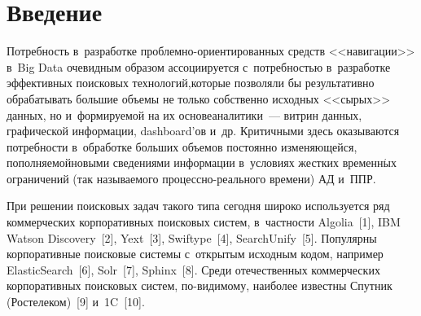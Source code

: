 

\vspace*{-2pt}



\thispagestyle{headings}

\begin{multicols}{2}

\label{st\stat}
   

  \section{Введение}
   
  Потребность в~разработке проблемно-ори\-ен\-ти\-ро\-ван\-ных средств 
<<навигации>> в~Big Data очевидным образом ассоциируется с~по\-треб\-ностью 
в~разработке эффективных поисковых технологий,\linebreak которые позволяли бы 
результативно обрабатывать большие объемы не только собственно исходных 
<<сырых>> данных, но и~формируемой на их основе\linebreak аналитики~--- витрин 
данных, графической информации, dashboard'ов и~др. Критичными здесь 
оказываются потребности в~обработке больших объемов постоянно 
изменяющейся, пополняемой\linebreak новыми сведениями информации в~условиях 
жестких временн$\acute{\mbox{ы}}$х ограничений (так называемого  
про\-цес\-сно-ре\-аль\-но\-го времени) АД и~ППР.
  
  При решении поисковых задач такого типа сегодня широко используется ряд 
коммерческих корпоративных поисковых систем, в~частности Algolia~[1], IBM 
Watson Discovery~[2], Yext~[3], Swiftype~[4], SearchUnify~[5]. Популярны 
корпоративные поисковые системы с~открытым исходным кодом, например 
ElasticSearch~[6], Solr~[7], Sphinx~[8]. Среди отечественных коммерческих 
корпоративных поисковых систем, по-видимому, наиболее известны Спутник 
(Ростелеком)~[9] и~1C~[10].
  

\end{multicols}

